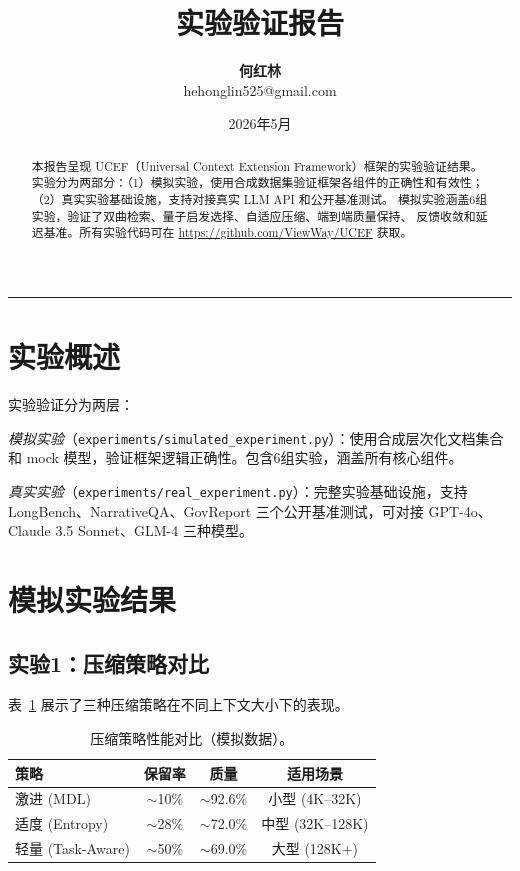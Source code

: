 \documentclass[11pt,a4paper]{article}
\title{\LARGE \ucef{} 实验验证报告}
\author{\textbf{何红林} \\ \small hehonglin525@gmail.com}
\date{2026年5月}
\newcommand{\ucef}{\textsf{UCEF}}
\begin{document}
\maketitle

\begin{abstract}
\noindent
本报告呈现 \ucef{}（Universal Context Extension Framework）框架的实验验证结果。
实验分为两部分：（1）模拟实验，使用合成数据集验证框架各组件的正确性和有效性；
（2）真实实验基础设施，支持对接真实 LLM API 和公开基准测试。
模拟实验涵盖6组实验，验证了双曲检索、量子启发选择、自适应压缩、端到端质量保持、
反馈收敛和延迟基准。所有实验代码可在 \url{https://github.com/ViewWay/UCEF} 获取。
\end{abstract}

\medskip
\noindent\rule{\textwidth}{0.4pt}
\medskip

\section{实验概述}

实验验证分为两层：

\emph{模拟实验}（\texttt{experiments/simulated\_experiment.py}）：使用合成层次化文档集合和 mock 模型，验证框架逻辑正确性。包含6组实验，涵盖所有核心组件。

\emph{真实实验}（\texttt{experiments/real\_experiment.py}）：完整实验基础设施，支持 LongBench、NarrativeQA、GovReport 三个公开基准测试，可对接 GPT-4o、Claude 3.5 Sonnet、GLM-4 三种模型。

\section{模拟实验结果}

\subsection{实验1：压缩策略对比}

表~\ref{tab:sim-compression} 展示了三种压缩策略在不同上下文大小下的表现。

\begin{table}[t]
\centering
\caption{压缩策略性能对比（模拟数据）。}
\label{tab:sim-compression}
\small
\begin{tabular}{@{}lccc@{}}
\toprule
策略 & 保留率 & 质量 & 适用场景 \\
\midrule
激进 (MDL) & $\sim$10\% & $\sim$92.6\% & 小型 (4K--32K) \\
适度 (Entropy) & $\sim$28\% & $\sim$72.0\% & 中型 (32K--128K) \\
轻量 (Task-Aware) & $\sim$50\% & $\sim$69.0\% & 大型 (128K+) \\
\bottomrule
\end{tabular}
\end{table}
\end{document}

